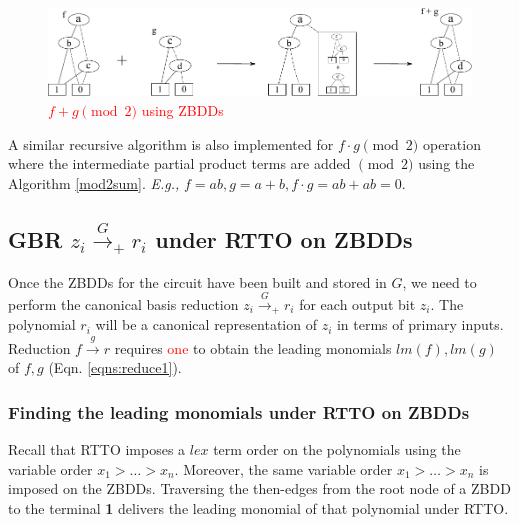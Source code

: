 \begin{figure}[hbt]
\centering
\includegraphics[scale=1]{mod2sumfig_new_1.pdf}
\caption{\textcolor{red}{$f+g\pmod 2$ using ZBDDs}}
\label{mod2sumfig}
\end{figure}

A similar recursive algorithm is also implemented for $f\cdot g \pmod
2$ operation where the intermediate partial product terms are added
$\pmod{2}$ using the Algorithm \ref{mod2sum}. {\it E.g.,} $f = ab, g =
a+b, f\cdot g = ab + ab = 0$. 


\subsection{GBR $z_i\xrightarrow{G}_+r_i$ under RTTO on ZBDDs}



Once the ZBDDs for the circuit have been built and stored in $G$, we
need to perform the canonical \Grobner basis reduction $z_i
\xrightarrow{G}_+r_i$ for each output bit $z_i$. The polynomial $r_i$
will be a canonical representation of $z_i$ in terms of primary
inputs. Reduction $f\xrightarrow{g} r$ requires \textcolor{red}{one} to obtain the leading
monomials $lm(f),lm(g)$ of $f, g$ (Eqn. \ref{eqns:reduce1}).


\subsubsection{Finding the leading monomials under RTTO on ZBDDs}
Recall that RTTO imposes a $lex$ term order on the polynomials using
the variable order $x_1>\dots>x_n$. Moreover, the same variable order
$x_1>\dots>x_n$ is imposed on the ZBDDs. Traversing the
then-edges from the root node of a ZBDD to the terminal {\bf 1}
delivers the leading monomial of that polynomial under RTTO.



